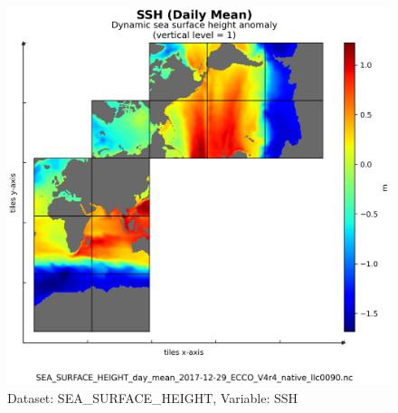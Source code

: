 \begin{longtable}{|m{}|m{}|m{}|m{}|}
\end{longtable}

\begin{figure}[H]
\centering
\includegraphics[scale=0.55]{../images/plots/native_plots/Sea_Surface_Height/SSH.png}
\caption{Dataset: SEA\_SURFACE\_HEIGHT, Variable: SSH}
\label{tab:table-SEA_SURFACE_HEIGHT_SSH-Plot}
\end{figure}
\newpage
\pagebreak
